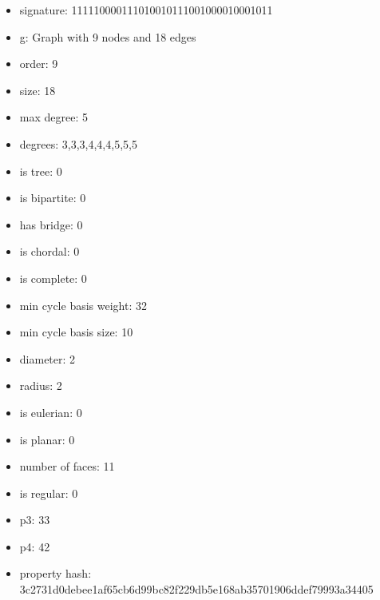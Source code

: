 \newpage
\begin{figure}
\end{figure}
\begin{itemize}
\item signature: 111110000111010010111001000010001011
\item g: Graph with 9 nodes and 18 edges
\item order: 9
\item size: 18
\item max degree: 5
\item degrees: 3,3,3,4,4,4,5,5,5
\item is tree: 0
\item is bipartite: 0
\item has bridge: 0
\item is chordal: 0
\item is complete: 0
\item min cycle basis weight: 32
\item min cycle basis size: 10
\item diameter: 2
\item radius: 2
\item is eulerian: 0
\item is planar: 0
\item number of faces: 11
\item is regular: 0
\item p3: 33
\item p4: 42
\item property hash: 3c2731d0debee1af65cb6d99bc82f229db5e168ab35701906ddef79993a34405
\end{itemize}
